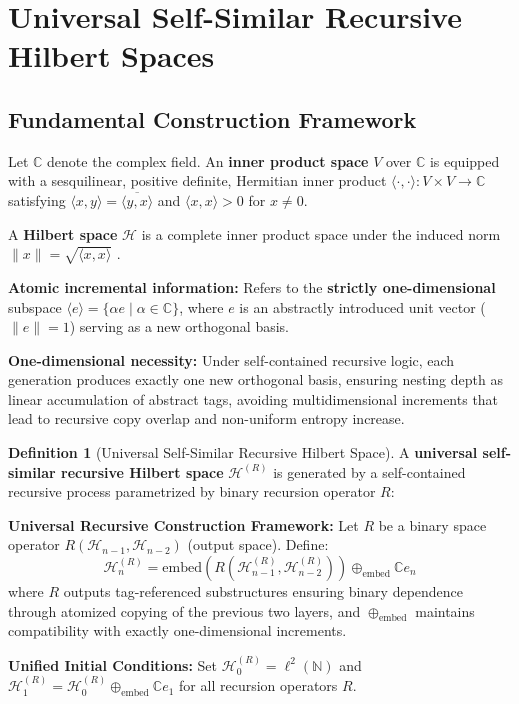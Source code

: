 \documentclass[12pt]{article}
\theoremstyle{plain}
\theoremstyle{definition}
\newtheorem{definition}[theorem]{Definition}
\begin{document}
\section{Universal Self-Similar Recursive Hilbert Spaces}

\subsection{Fundamental Construction Framework}

Let $\mathbb{C}$ denote the complex field. An \textbf{inner product space} $V$ over $\mathbb{C}$ is equipped with a sesquilinear, positive definite, Hermitian inner product $\langle \cdot, \cdot \rangle: V \times V \to \mathbb{C}$ satisfying $\langle x, y \rangle = \overline{\langle y, x \rangle}$ and $\langle x, x \rangle > 0$ for $x \neq 0$.

A \textbf{Hilbert space} $\mathcal{H}$ is a complete inner product space under the induced norm $\|x\| = \sqrt{\langle x, x \rangle}$ \cite{rudin1991}.

\textbf{Atomic incremental information:} Refers to the \textbf{strictly one-dimensional} subspace $\langle e \rangle = \{\alpha e \mid \alpha \in \mathbb{C}\}$, where $e$ is an abstractly introduced unit vector ($\|e\| = 1$) serving as a new orthogonal basis.

\textbf{One-dimensional necessity:} Under self-contained recursive logic, each generation produces exactly one new orthogonal basis, ensuring nesting depth as linear accumulation of abstract tags, avoiding multidimensional increments that lead to recursive copy overlap and non-uniform entropy increase.

\begin{definition}[Universal Self-Similar Recursive Hilbert Space]
\label{def:universal-recursive-space}
A \textbf{universal self-similar recursive Hilbert space} $\mathcal{H}^{(R)}$ is generated by a self-contained recursive process parametrized by binary recursion operator $R$:

\textbf{Universal Recursive Construction Framework:}
Let $R$ be a binary space operator $R(\mathcal{H}_{n-1}, \mathcal{H}_{n-2})$ (output space). Define:
$$\mathcal{H}_n^{(R)} = \text{embed}(R(\mathcal{H}_{n-1}^{(R)}, \mathcal{H}_{n-2}^{(R)})) \oplus_{\text{embed}} \mathbb{C} e_n$$
where $R$ outputs tag-referenced substructures ensuring binary dependence through atomized copying of the previous two layers, and $\oplus_{\text{embed}}$ maintains compatibility with exactly one-dimensional increments.

\textbf{Unified Initial Conditions:} Set $\mathcal{H}_0^{(R)} = \ell^2(\mathbb{N})$ and $\mathcal{H}_1^{(R)} = \mathcal{H}_0^{(R)} \oplus_{\text{embed}} \mathbb{C} e_1$ for all recursion operators $R$.
\end{definition}
\end{document}
